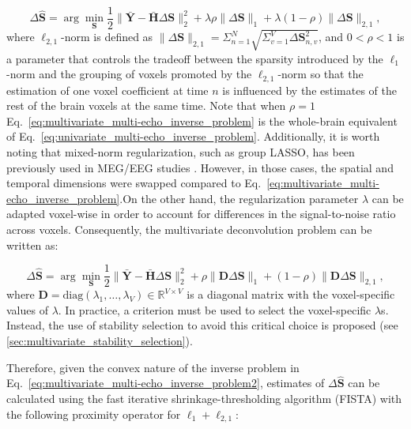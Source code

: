 \begin{equation}
    \Delta \hat{\mathbf{S}} = \arg \min_{\mathbf{S}} \frac{1}{2}
    \| \bar{\mathbf{Y}} - \bar{\mathbf{H}} \Delta \mathbf{S} \|_2^2
    + \lambda \rho \| \Delta \mathbf{S} \|_1
    + \lambda (1 - \rho) \| \Delta \mathbf{S} \|_{2,1},
    \label{eq:multivariate_multi-echo_inverse_problem}
\end{equation}
where $\ell_{2,1}$-norm is defined as $\| \Delta \mathbf{S} \|_{2,1} =
\Sigma_{n=1}^{N} \sqrt{ \Sigma_{v=1}^{V} \Delta \mathbf{S}_{n,v}^2} $, and
$0<\rho<1$ is a parameter that controls the tradeoff between the sparsity
introduced by the $\ell_1$-norm and the grouping of voxels promoted by the
$\ell_{2,1}$-norm so that the estimation of one voxel coefficient at time $n$ is
influenced by the estimates of the rest of the brain voxels at the same time.
Note that when $\rho=1$ Eq.~\eqref{eq:multivariate_multi-echo_inverse_problem}
is the whole-brain equivalent of
Eq.~\eqref{eq:univariate_multi-echo_inverse_problem}. Additionally, it is worth
noting that mixed-norm regularization, such as group LASSO, has been previously
used in MEG/EEG studies \citep{Gramfort2011FunctionalBrainImaging}. However, in
those cases, the spatial and temporal dimensions were swapped compared to
Eq.~\eqref{eq:multivariate_multi-echo_inverse_problem}.On the other hand, the
regularization parameter $\lambda$ can be adapted voxel-wise in order to account
for differences in the signal-to-noise ratio across voxels. Consequently, the
multivariate deconvolution problem can be written as:

\begin{equation}
    \Delta \hat{\mathbf{S}} = \arg \min_{\mathbf{S}} \frac{1}{2}
    \| \bar{\mathbf{Y}} - \bar{\mathbf{H}} \Delta \mathbf{S} \|_2^2
    + \rho \| \mathbf{D} \Delta \mathbf{S} \|_1
    + (1 - \rho) \| \mathbf{D} \Delta \mathbf{S} \|_{2,1},
    \label{eq:multivariate_multi-echo_inverse_problem2}
\end{equation}
where $\mathbf{D} = \text{diag}\left(\lambda_1, \dots, \lambda_V \right) \in
\mathbb{R}^{V \times V}$ is a diagonal matrix with the voxel-specific values of
$\lambda$. In practice, a criterion must be used to select the voxel-specific
$\lambda$s. Instead, the use of stability selection to avoid this critical
choice is proposed (see \cref{sec:multivariate_stability_selection}). 

Therefore, given the convex nature of the inverse problem in
Eq.~\eqref{eq:multivariate_multi-echo_inverse_problem2}, estimates of $\Delta
\hat{\mathbf{S}}$ can be calculated using the fast iterative
shrinkage-thresholding algorithm (FISTA) \citep{Beck2009FastIterativeShrinkage}
with the following proximity operator for $\ell_1 + \ell_{2,1}$:

